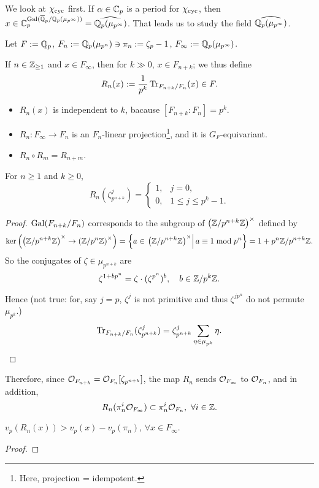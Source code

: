 We look at $\chi_{\mathrm{cyc}}$ first.
If $\alpha\in\mathbb{C}_p$ is a period for $\chi_{\mathrm{cyc}}$,
then $x\in \mathbb{C}_p^{\operatorname{Gal}(\overline{\mathbb{Q}}_p/\mathbb{Q}_p(\mu_{p^\infty}))} = \widehat{\mathbb{Q}_p(\mu_{p^\infty})}$.
That leads us to study the field $\widehat{\mathbb{Q}_p(\mu_{p^\infty})}$.

Let $F := \mathbb{Q}_p$,
$F_n := \mathbb{Q}_p(\mu_{p^n})\ni \pi_n := \zeta_p - 1$,
$F_\infty := \mathbb{Q}_p(\mu_{p^\infty})$.

If $n\in\mathbb{Z}_{\ge 1}$ and $x\in F_\infty$, then for $k\gg 0$,
$x\in F_{n+k}$;
we thus define \[R_n(x) := \frac{1}{p^k }\operatorname{Tr}_{F_{n+k}/F_n}(x)\in F.\]
\begin{itemize}
\item $R_n(x)$ is independent to $k$, bacause $[F_{n+k} : F_n] = p^k$.
\item $R_n : F_\infty\to F_n$ is an $F_n$-linear projection\footnote{Here, projection = idempotent.}, and it is $G_F$-equivariant.
\item $R_n\circ R_m = R_{n + m}$.
\end{itemize}

\begin{lemma}
    For $n\ge 1$ and $k\ge 0$,
    \[R_n(\zeta_{p^{n+k}}^j) = \begin{cases}
        1, & j  = 0,\\ 0, &1\le j\le p^{k}-1.
    \end{cases}\]
\end{lemma}
\begin{proof}
    $\operatorname{Gal}(F_{n+k}/F_n)$ corresponds to the subgroup of $\left( \mathbb{Z}/p^{n+k}\mathbb{Z} \right)^\times$ defined by \[\ker\left( \left( \mathbb{Z}/p^{n+k}\mathbb{Z} \right)^\times\to \left( \mathbb{Z}/p^{n}\mathbb{Z} \right)^\times \right)
    = \left\{a\in \left.\left( \mathbb{Z}/p^{n+k}\mathbb{Z} \right)^\times\right|a\equiv 1\bmod p^n \right\} = 1 + p^n\mathbb{Z}/p^{n+k}\mathbb{Z}.\]
    So the conjugates of $\zeta\in\mu_{p^{n+k}}$ are
    \[\zeta^{1 + bp^n} = \zeta\cdot(\zeta^{p^n})^b, \quad b\in \mathbb{Z}/p^{k}\mathbb{Z}.\]

    Hence
{\color{red}    (not true: for, say $j = p$, $\zeta^j$ is not primitive and thus $\zeta^{jp^n}$ do not permute $\mu_{p^k}$.)
}    \[\operatorname{Tr}_{F_{n+k}/F_n}(\zeta_{p^{n+k}}^j) = \zeta_{p^{n+k}}^j\sum_{\eta\in\mu_{p^k}}\eta.\qedhere\]
\end{proof}
Therefore, since $\mathcal{O}_{F_{n+k}} = \mathcal{O}_{F_n}[\zeta_{p^{n+k}}]$, the map $R_n$ sends $\mathcal{O}_{F_\infty}$ to $\mathcal{O}_{F_n}$,
and in addition, \[R_n(\pi_n^i\mathcal{O}_{F_\infty}) \subset \pi_n^i\mathcal{O}_{F_n},\ \forall i\in\mathbb{Z}.\]
\begin{corollary}
    $v_p(R_n(x)) > v_p(x) - v_p(\pi_n)$, $\forall x\in F_\infty$.
\end{corollary}
\begin{proof}
    
\end{proof}

